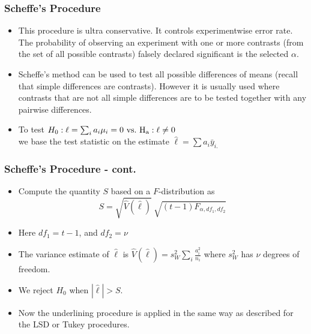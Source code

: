 \documentclass[xcolor=dvipsnames,12pt]{beamer}
\begin{document}
\begin{frame}
\frametitle{Scheffe's Procedure}
\begin{itemize}
\item This procedure is ultra conservative.  It controls experimentwise 
error rate.  The probability of observing an experiment 
with one or more contrasts (from the set of all possible 
contrasts) falsely declared significant is the selected
$\alpha$. 
\item Scheffe's method can be used to test all possible differences of
means (recall that simple differences are contrasts).  However it
is usually used where contrasts that are not all
simple differences are to be tested together with any pairwise
differences.
\item  To test $
  H_0: \ell = \sum_i a_i\mu_i = 0 \ \rm{vs.}~ H_a: \ell \neq 0$\\[.1in]
 we base the test statistic on the estimate $\hat{\ell} = \sum a_i \bar{y}_{i.}$
\end{itemize}
\end{frame}



\begin{frame}
\frametitle{Scheffe's Procedure - cont.}
\begin{itemize}
\item Compute the quantity $S$ based on a $F$-distribution as
$$  S = \sqrt{\hat{V}(\hat{\ell})} \ \sqrt{(t-1)F_{\alpha,df_1,df_2}}$$
\item Here $ df_1 = t-1$, and  $df_2 = \nu$ 
\item The variance estimate of $\hat{\ell}$ is  $\hat{V}(\hat{\ell}) = s_W^2 \sum_i \frac{a_i^2}{n_i}$
where $s_W^2$ has $\nu$ degrees of freedom.
\item We reject 
$H_0$ when $|\hat{\ell}| > S$.  
\item Now the underlining procedure is applied in the same way as described for the LSD or
Tukey procedures.
\end{itemize}
\end{frame}
\end{document}
